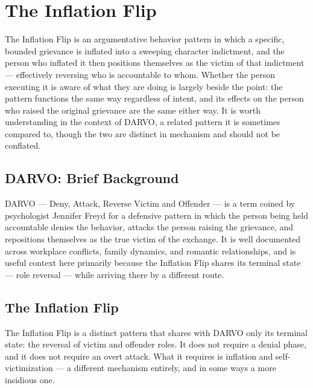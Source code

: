 \chapter{The Inflation Flip}

The Inflation Flip is an argumentative behavior pattern in which a specific, bounded grievance is inflated into a sweeping character indictment, and the person who inflated it then positions themselves as the victim of that indictment --- effectively reversing who is accountable to whom.
Whether the person executing it is aware of what they are doing is largely beside the point: the pattern functions the same way regardless of intent, and its effects on the person who raised the original grievance are the same either way.
It is worth understanding in the context of DARVO, a related pattern it is sometimes compared to, though the two are distinct in mechanism and should not be conflated.

\section{DARVO: Brief Background}

DARVO --- Deny, Attack, Reverse Victim and Offender --- is a term coined by psychologist Jennifer Freyd for a defensive pattern in which the person being held accountable denies the behavior, attacks the person raising the grievance, and repositions themselves as the true victim of the exchange.
It is well documented across workplace conflicts, family dynamics, and romantic relationships, and is useful context here primarily because the Inflation Flip shares its terminal state --- role reversal --- while arriving there by a different route.

\section{The Inflation Flip}

The Inflation Flip is a distinct pattern that shares with DARVO only its terminal state: the reversal of victim and offender roles.
It does not require a denial phase, and it does not require an overt attack.
What it requires is inflation and self-victimization --- a different mechanism entirely, and in some ways a more insidious one.

